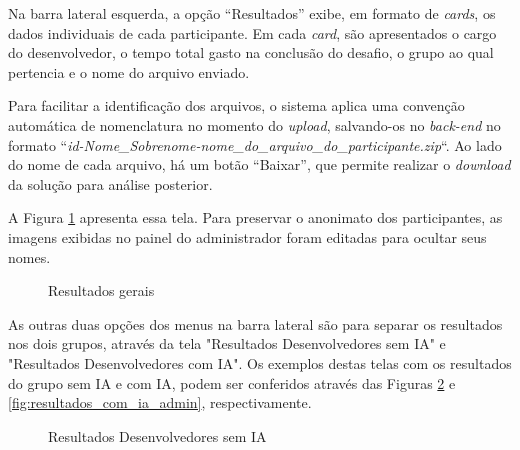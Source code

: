 \documentclass[english,brazilian]{UNISINOSartigo} %
\begin{document}
Na barra lateral esquerda, a opção “Resultados” exibe, em formato de \textit{cards}, os dados individuais de cada participante. Em cada \textit{card}, são apresentados o cargo do desenvolvedor, o tempo total gasto na conclusão do desafio, o grupo ao qual pertencia e o nome do arquivo enviado.

Para facilitar a identificação dos arquivos, o sistema aplica uma convenção automática de nomenclatura no momento do \textit{upload}, salvando-os no \textit{back-end} no formato ``\textit{id-Nome\_Sobrenome-nome\_do\_arquivo\_do\_participante.zip}``. Ao lado do nome de cada arquivo, há um botão “Baixar”, que permite realizar o \textit{download} da solução para análise posterior.

A Figura \ref{fig:resultados_gerais_admin} apresenta essa tela. Para preservar o anonimato dos participantes, as imagens exibidas no painel do administrador foram editadas para ocultar seus nomes.

\begin{figure}[ht]
    \caption{Resultados gerais}
    \label{fig:resultados_gerais_admin}
    \centering
    \footnotesize
    \begin{minipage}{.9\textwidth}
        \centering
    \end{minipage}
\end{figure}
\FloatBarrier

As outras duas opções dos menus na barra lateral são para separar os resultados nos dois grupos, através da tela "Resultados Desenvolvedores sem IA" e "Resultados Desenvolvedores com IA". Os exemplos destas telas com os resultados do grupo sem IA e com IA, podem ser conferidos através das Figuras \ref{fig:resultados_sem_ia_admin} e \ref{fig:resultados_com_ia_admin}, respectivamente.

\begin{figure}[ht]
    \caption{Resultados Desenvolvedores sem IA}
    \label{fig:resultados_sem_ia_admin}
    \centering
    \footnotesize
    \begin{minipage}{.9\textwidth}
        \centering
    \end{minipage}
\end{figure}
\FloatBarrier
\end{document}
